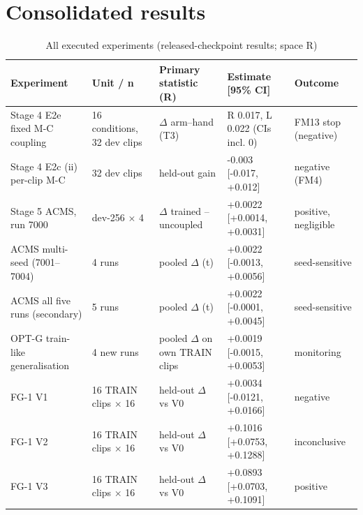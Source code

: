 \documentclass[conference]{IEEEtran}
\begin{document}
\section{Consolidated results}
\begin{table}[t]\centering\caption{All executed experiments (released-checkpoint results; space R)}\footnotesize\begin{tabular}{lllll}\toprule \textbf{Experiment} & \textbf{Unit / n} & \textbf{Primary statistic (R)} & \textbf{Estimate [95\% CI]} & \textbf{Outcome} \\ \midrule Stage 4 E2e fixed M-C coupling & 16 conditions, 32 dev clips & $\Delta$ arm--hand (T3) & R 0.017, L 0.022 (CIs incl. 0) & FM13 stop (negative) \\ Stage 4 E2c (ii) per-clip M-C & 32 dev clips & held-out gain & -0.003 [-0.017, +0.012] & negative (FM4) \\ Stage 5 ACMS, run 7000 & dev-256 $\times$ 4 & $\Delta$ trained -- uncoupled & +0.0022 [+0.0014, +0.0031] & positive, negligible \\ ACMS multi-seed (7001--7004) & 4 runs & pooled $\Delta$ (t) & +0.0022 [-0.0013, +0.0056] & seed-sensitive \\ ACMS all five runs (secondary) & 5 runs & pooled $\Delta$ (t) & +0.0022 [-0.0001, +0.0045] & seed-sensitive \\ OPT-G train-like generalisation & 4 new runs & pooled $\Delta$ on own TRAIN clips & +0.0019 [-0.0015, +0.0053] & monitoring \\ FG-1 V1 & 16 TRAIN clips $\times$ 16 & held-out $\Delta$ vs V0 & +0.0034 [-0.0121, +0.0166] & negative \\ FG-1 V2 & 16 TRAIN clips $\times$ 16 & held-out $\Delta$ vs V0 & +0.1016 [+0.0753, +0.1288] & inconclusive \\ FG-1 V3 & 16 TRAIN clips $\times$ 16 & held-out $\Delta$ vs V0 & +0.0893 [+0.0703, +0.1091] & positive \\ \bottomrule\end{tabular}\end{table}
\end{document}
